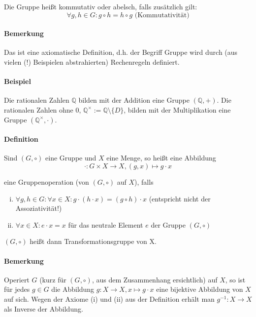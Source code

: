 	Die Gruppe heißt kommutativ oder abelsch, falls zusätzlich gilt:
	\begin{equation*}
		\forall g,h\in G: g\circ h = h\circ g \text{ (Kommutativität)}
	\end{equation*}

\paragraph{Bemerkung}
	Das ist eine axiomatische Definition, d.h. der Begriff \glqq Gruppe\grqq{} wird durch (aus vielen (!) Beispielen abstrahierten) \glqq Rechenregeln\grqq{} definiert.
\paragraph{Beispiel}
	Die rationalen Zahlen $\mathbb{Q}$ bilden mit der Addition eine Gruppe $(\mathbb{Q} ,+)$.
	Die rationalen Zahlen ohne $0$, $\mathbb{Q}^{\times} := \mathbb{Q}\setminus \{D\}$, bilden mit der Multiplikation eine Gruppe $(\mathbb{Q}^\times ,\cdot)$.

\paragraph{Definition}
	Sind $(G,\circ )$ eine Gruppe und $X$ eine Menge, so heißt eine Abbildung
	\begin{equation*}
		\cdot : G\times X\to X, (g,x)\mapsto g\cdot x
	\end{equation*}
	
	eine Gruppenoperation (von $(G,\circ )$ auf $X$), falls

	\begin{enumerate}[(i)]
		\item $\forall g,h\in G :\forall x\in X: g\cdot (h\cdot x) = (g\circ h)\cdot x$ (entspricht nicht der Assoziativität!)
		\item $\forall x\in X: e\cdot x = x$ für das neutrale Element $e$ der Gruppe $(G,\circ )$
	\end{enumerate}
	$(G,\circ )$ heißt dann Transformationsgruppe von X.

\paragraph{Bemerkung}
	Operiert $G$ (kurz für $(G,\circ )$, aus dem Zusammenhang ersichtlich) auf $X$, so ist für jedes $g\in G$ die Abbildung $g:X\to X, x\mapsto g\cdot x$ eine bijektive Abbildung von $X$ auf sich. Wegen der Axiome (i) und (ii) aus der Definition erhält man $g^{-1}: X\to X$ als Inverse der Abbildung.
